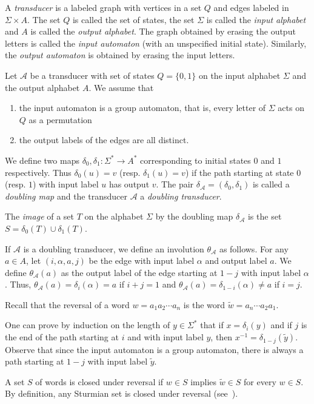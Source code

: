 \documentclass[preprint,12pt]{elsarticle}
\newcommand\A{\mathcal{A}}
\numberwithin{theorem}{section}
\numberwithin{equation}{section}
\numberwithin{figure}{section}
\numberwithin{table}{section}
\begin{document}
A \emph{transducer} is a labeled graph with vertices
in a set $Q$ and edges labeled in $\Sigma\times A$. The set $Q$ is called the set of states, the set $\Sigma$ is called the \emph{input alphabet}
and $A$ is called the \emph{output alphabet}.
The graph obtained by erasing the output
letters is called the \emph{input automaton} (with an unspecified initial state). Similarly, the \emph{output automaton} is obtained by erasing the input letters.

Let $\A$ be a transducer with set of states $Q=\{0,1\}$ on the input alphabet
$\Sigma$ and the output alphabet $A$. We assume that
\begin{enumerate}
\item the input automaton is a group automaton,
 that is, every
letter of $\Sigma$ acts on $Q$ as a permutation
\item the output labels of the edges are all distinct.
\end{enumerate}
  We define two maps $\delta_0,\delta_1:\Sigma^*\rightarrow A^*$ corresponding to initial states
$0$ and $1$ respectively. 
Thus $\delta_0(u)=v$ (resp. $\delta_1(u)=v$) if the path starting at state $0$ (resp. $1$) with input label $u$ has output $v$.
The pair $\delta_\A = (\delta_0,\delta_1)$ is called a \emph{doubling map}
and the transducer $\A$ a \emph{doubling transducer}.

The \emph{image} of a set $T$ on the alphabet $\Sigma$
by the doubling map $\delta_\A$ is the set $S=\delta_0(T)\cup \delta_1(T)$.

If $\A$ is a doubling transducer, we define an involution $\theta_\A$
as follows. For any $a\in A$, let $(i,\alpha,a,j)$ be the edge with input
label $\alpha$ and output label $a$. We define $\theta_\A(a)$ as the output
label of the edge starting at $1-j$ with input label $\alpha$. Thus, $\theta_\A(a)=\delta_i(\alpha)=a$
if $i+j=1$ and $\theta_\A(a)=\delta_{1-i}(\alpha)\ne a$ if $i=j$.

Recall that the reversal of a word $w=a_1a_2\cdots a_n$ is the word $\tilde{w}=a_n\cdots a_2a_1$.

One can prove by induction on the length of $y \in \Sigma^*$ that if $x = \delta_i(y)$ and if $j$ is the end of the path starting at $i$ and with input label $y$, then $x^{-1} = \delta_{1-j}(\tilde{y})$.
Observe that since the input automaton is a group automaton, there is always a path starting at $1-j$ with input label $\tilde{y}$.

A set $S$ of words is closed under reversal if $w\in S$ implies $\tilde{w}\in S$ for every $w\in S$.
By definition, any Sturmian set is closed under reversal (see~\cite{BerstelDeFelicePerrinReutenauerRindone2012}).
\end{document}
